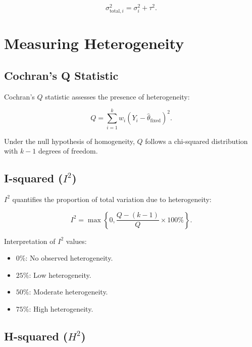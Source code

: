 \documentclass[12pt,a4paper]{report}
\begin{document}
\begin{equation}
\label{eq:total_variance_decomposition}
\sigma_{\text{total}, i}^2 = \sigma_i^2 + \tau^2.
\end{equation}

\section{Measuring Heterogeneity}
\label{sec:measuring_heterogeneity}

\subsection{Cochran's Q Statistic}
\label{subsec:cochrans_q}

Cochran's $Q$ statistic assesses the presence of heterogeneity:

\begin{equation}
\label{eq:q_statistic}
Q = \sum_{i=1}^k w_i (Y_i - \hat{\theta}_{\text{fixed}})^2.
\end{equation}

Under the null hypothesis of homogeneity, $Q$ follows a chi-squared distribution with $k - 1$ degrees of freedom.

\subsection{I-squared ($I^2$)}
\label{subsec:i_squared}

$I^2$ quantifies the proportion of total variation due to heterogeneity:

\begin{equation}
\label{eq:i_squared}
I^2 = \max\left\{0, \frac{Q - (k - 1)}{Q} \times 100\% \right\}.
\end{equation}

Interpretation of $I^2$ values:

\begin{itemize}
    \item $0\%$: No observed heterogeneity.
    \item $25\%$: Low heterogeneity.
    \item $50\%$: Moderate heterogeneity.
    \item $75\%$: High heterogeneity.
\end{itemize}

\subsection{H-squared ($H^2$)}
\label{subsec:h_squared}
\end{document}

